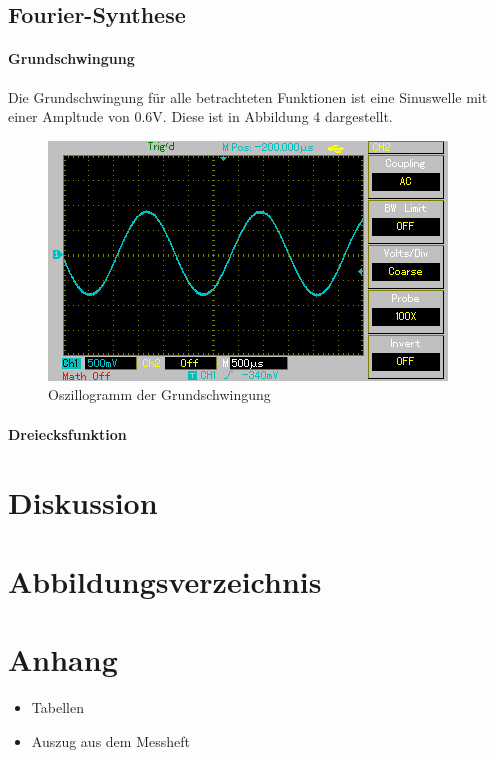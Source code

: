 \documentclass[11pt,ngerman,a4paper]{article}
\begin{document}
\subsection{Fourier-Synthese} 
\paragraph{Grundschwingung} Die Grundschwingung f\"ur alle betrachteten Funktionen ist eine Sinuswelle mit einer Ampltude von $0.6$V. Diese ist in Abbildung 4 dargestellt.
\begin{figure}[h]
\centering
\includegraphics[scale=0.8]{Screenshots/basic.png}
\caption{Oszillogramm der Grundschwingung}

\end{figure}
\paragraph{Dreiecksfunktion}
\paragraph{}

\section{Diskussion}
\section{Abbildungsverzeichnis}
\section{Anhang}
\begin{itemize}
\item Tabellen
\item Auszug aus dem Messheft
\end{itemize}
\end{document}
